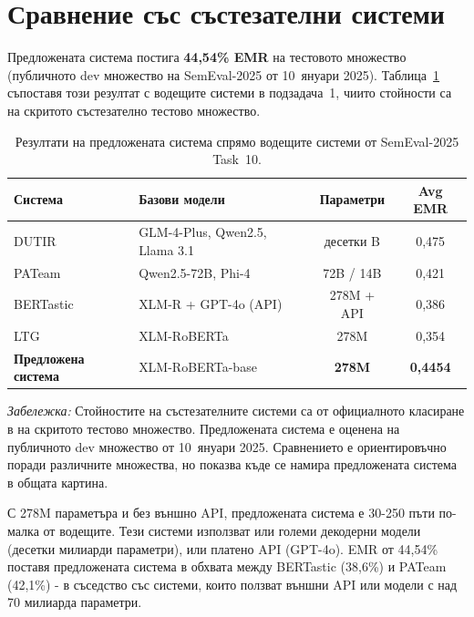 \documentclass[12pt,a4paper]{report}
\begin{document}
\section{Сравнение със състезателни системи}

Предложената система постига \textbf{44,54\% EMR} на тестовото множество (публичното dev множество на SemEval-2025 от 10~януари 2025). Таблица~\ref{tab:semeval_comparison} съпоставя този резултат с водещите системи в подзадача~1, чиито стойности са на скритото състезателно тестово множество.

\begin{table}[H]
\centering
\caption{Резултати на предложената система спрямо водещите системи от SemEval-2025 Task~10.}
\label{tab:semeval_comparison}
\small
\setlength{\tabcolsep}{4pt}
\begin{tabularx}{\textwidth}{@{}lXcc@{}}
\toprule
\textbf{Система} & \textbf{Базови модели} & \textbf{Параметри} & \textbf{Avg EMR} \\
\midrule
DUTIR \cite{lv2025dutir} & GLM-4-Plus, Qwen2.5, Llama 3.1 & десетки B & 0,475 \\
PATeam & Qwen2.5-72B, Phi-4 & 72B / 14B & 0,421 \\
BERTastic \cite{mahmoud2025bertastic} & XLM-R + GPT-4o (API) & 278M + API & 0,386 \\
LTG \cite{ronningstad2025ltg} & XLM-RoBERTa & 278M & 0,354 \\
\midrule
\textbf{Предложена система} & XLM-RoBERTa-base & \textbf{278M} & \textbf{0,4454} \\
\bottomrule
\end{tabularx}

\vspace{0.3em}
\small\textit{Забележка:} Стойностите на състезателните системи са от официалното класиране в \cite{piskorski2025semeval} на скритото тестово множество. Предложената система е оценена на публичното dev множество от 10~януари 2025. Сравнението е ориентировъчно поради различните множества, но показва къде се намира предложената система в общата картина.
\end{table}

С 278M параметъра и без външно API, предложената система е 30-250 пъти по-малка от водещите. Тези системи използват или големи декодерни модели (десетки милиарди параметри), или платено API (GPT-4o). EMR от 44,54\% поставя предложената система в обхвата между BERTastic (38,6\%) и PATeam (42,1\%) - в съседство със системи, които ползват външни API или модели с над 70 милиарда параметри.
\end{document}
